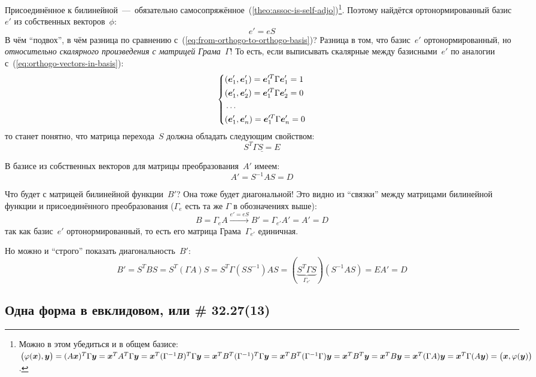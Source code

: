 \documentclass[a4paper,12pt]{article}
\theoremstyle{remark}
\begin{document}
  Присоединённое к билинейной~---~обязательно самосопряжённое~(\ref{theo:assoc-is-self-adjo})\footnote{Можно в этом убедиться и в общем базисе: $\bigl(\phi(\bds x), \bds y\bigr) \hm= (A \bds x)^T \Gamma \bds y \hm= \bds x^T A^T \Gamma \bds y \hm= \bds x^T (\Gamma^{-1} B)^T \Gamma \bds y \hm= \bds x^T B^T (\Gamma^{-1})^T \Gamma \bds y \hm= \bds x^T B^T (\Gamma^{-1} \Gamma) \bds y \hm= \bds x^T B^T \bds y \hm= \bds x^T B \bds y \hm= \bds x^T (\Gamma A) \bds y \hm= \bds x^T \Gamma (A \bds y) \hm= \bigl(\bds x, \phi(\bds y)\bigr)$.}.
  Поэтому найдётся ортонормированный базис~$e'$ из собственных векторов~$\phi$:
  \[
    e' = e S
  \]
  В чём ``подвох'', в чём разница по сравнению с~(\ref{eq:from-orthogo-to-orthogo-basis})?
  Разница в том, что базис~$e'$ ортонормированный, но \emph{относительно скалярного произведения с матрицей Грама~$\Gamma$}!
  То есть, если выписывать скалярные между базисными~$e'$ по аналогии с~(\ref{eq:orthogo-vectors-in-basis}):
  \[
    \left\{
      \begin{aligned}
        &(\boldsymbol e_1', \boldsymbol e_1') = \boldsymbol e_1^{\prime T} \Gamma \boldsymbol e_1' = 1\\
        &(\boldsymbol e_1', \boldsymbol e_2') = \boldsymbol e_1^{\prime T} \Gamma \boldsymbol e_2' = 0\\
        &\ldots\\
        &(\boldsymbol e_1', \boldsymbol e_n') = \boldsymbol e_1^{\prime T} \Gamma \boldsymbol e_n' = 0\\
      \end{aligned}
    \right.
  \]
  то станет понятно, что матрица перехода~$S$ должна обладать следующим свойством:
  \[
    \underline{S^T \Gamma S = E}
  \]
  
  В базисе из собственных векторов для матрицы преобразования~$A'$ имеем:
  \[
    A' = S^{-1} A S = D
  \]
  
  Что будет с матрицей билинейной функции~$B'$?
  Она тоже будет диагональной!
  Это видно из ``связки'' между матрицами билинейной функции и присоединённого преобразования ($\Gamma_{e}$ есть та же $\Gamma$ в обозначениях выше):
  \[
    B = \Gamma_{e} A \xrightarrow{e' = e S} B' = \Gamma_{e'} A' = A' = D
  \]
  так как базис~$e'$ ортонормированный, то есть его матрица Грама~$\Gamma_{e'}$ единичная.
  
  Но можно и ``строго'' показать диагональность~$B'$:
  \[
    B' = S^T B S
    = S^T (\Gamma A) S
    = S^T \Gamma (S S^{-1}) A S
    = (\underbrace{S^T \Gamma S}_{\Gamma_{e'}}) (S^{-1} A S)
    = E A'
    = D
  \]
    

  \subsection{Одна форма в евклидовом, или \# 32.27(13)}\label{seq:p32-27}
  
\end{document}
